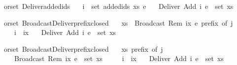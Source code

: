 \begin{isabellebody}
\isamarkupfalse%
\ {\isacharparenleft}\ orset{\isacharparenright}\ Deliver{\isacharunderscore}added{\isacharunderscore}ids{\isacharcolon}\isanewline
\ \ \ {\isachardoublequoteopen}i\ {\isasymin}\ set\ {\isacharparenleft}added{\isacharunderscore}ids\ xs\ e{\isacharparenright}{\isachardoublequoteclose}\isanewline
\ \ \ {\isachardoublequoteopen}Deliver\ {\isacharparenleft}Add\ i\ e{\isacharparenright}\ {\isasymin}\ set\ xs{\isachardoublequoteclose}\isanewline
\end{isabellebody}

\begin{isabellebody}
\isamarkupfalse%
\ {\isacharparenleft}\ orset{\isacharparenright}\ Broadcast{\isacharunderscore}Deliver{\isacharunderscore}prefix{\isacharunderscore}closed{\isacharcolon}\isanewline
\ \ \ {\isachardoublequoteopen}xs\ {\isacharat}\ {\isacharbrackleft}Broadcast\ {\isacharparenleft}Rem\ ix\ e{\isacharparenright}{\isacharbrackright}\ prefix\ of\ j{\isachardoublequoteclose}\isanewline
\ \ \ \ \ {\isachardoublequoteopen}i\ {\isasymin}\ ix{\isachardoublequoteclose}\isanewline
\ \ \ {\isachardoublequoteopen}Deliver\ {\isacharparenleft}Add\ i\ e{\isacharparenright}\ {\isasymin}\ set\ xs{\isachardoublequoteclose}\isanewline
\end{isabellebody}

\begin{isabellebody}
\isamarkupfalse%
\ {\isacharparenleft}\ orset{\isacharparenright}\ Broadcast{\isacharunderscore}Deliver{\isacharunderscore}prefix{\isacharunderscore}closed{}{\isacharcolon}\isanewline
\ \ \ {\isachardoublequoteopen}xs\ prefix\ of\ j{\isachardoublequoteclose}\isanewline
\ \ \ \ \ {\isachardoublequoteopen}Broadcast\ {\isacharparenleft}Rem\ ix\ e{\isacharparenright}\ {\isasymin}\ set\ xs{\isachardoublequoteclose}\isanewline
\ \ \ \ \ {\isachardoublequoteopen}i\ {\isasymin}\ ix{\isachardoublequoteclose}\isanewline
\ \ \ {\isachardoublequoteopen}Deliver\ {\isacharparenleft}Add\ i\ e{\isacharparenright}\ {\isasymin}\ set\ xs{\isachardoublequoteclose}\isanewline
\end{isabellebody}

